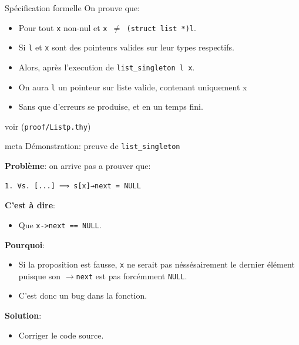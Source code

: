 \documentclass[hyperref={pdfpagelabels=false}]{beamer}
\begin{document}
\begin{frame}[fragile]{Spécification formelle}
  On prouve que:\\
  \begin{itemize}
    \item<2-> Pour tout \texttt{x} non-nul et \texttt{x $\neq$ (struct list *)l}.
    \item<3-> Si \texttt{l} et \texttt{x} sont des pointeurs valides sur leur types respectifs.
    \item<4-> Alors, après l'execution de \texttt{list\_singleton l x}.
    \item<5-> On aura \texttt{l} un pointeur sur liste valide, contenant uniquement x
    \item<6-> Sans que d'erreurs se produise, et en un temps fini.
  \end{itemize}

  \vfill
  \hfill
  {\tiny voir (\texttt{proof/Listp.thy})}
\end{frame}

\begin{frame}

  \begin{beamercolorbox}[sep=8pt,center,shadow=true,rounded=true]{meta}
    Démonstration: preuve de \texttt{list\_singleton}\par%
  \end{beamercolorbox}
\end{frame}

\begin{frame}[fragile]
  \textbf{Problème}: on arrive pas a prouver que:
  \begin{lstlisting}
1. ∀s. [...] ⟹ s[x]→next = NULL
  \end{lstlisting}
  \pause
  \textbf{C'est à dire}:
  \begin{itemize}
    \item Que \texttt{x->next == NULL}.
  \end{itemize}
  \pause
  \textbf{Pourquoi}:
  \begin{itemize}
    \item Si la proposition est fausse, \texttt{x} ne serait pas néssésairement le dernier élément puisque son \texttt{$\rightarrow$next} est pas forcémment \texttt{NULL}.
    \item C'est donc un bug dans la fonction.
  \end{itemize}
  \pause
  \textbf{Solution}:
  \begin{itemize}
    \item Corriger le code source.
  \end{itemize}
\end{frame}
\end{document}
